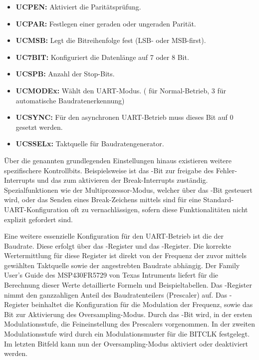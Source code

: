 \begin{itemize}
	\item \textbf{UCPEN:} Aktiviert die Parit\"atspr\"ufung.
	\item \textbf{UCPAR:} Festlegen einer geraden oder ungeraden Parit\"at.
	\item \textbf{UCMSB:} Legt die Bitreihenfolge fest (LSB- oder MSB-first).
	\item \textbf{UC7BIT:} Konfiguriert die Datenl\"ange auf 7 oder 8 Bit.
	\item \textbf{UCSPB:} Anzahl der Stop-Bits.
	\item \textbf{UCMODEx:} W\"ahlt den UART-Modus. ( f\"ur Normal-Betrieb, 3 f\"ur  automatische Baudratenerkennung)
	\item \textbf{UCSYNC:} F\"ur den asynchronen UART-Betrieb muss dieses Bit auf 0 gesetzt werden.
	\item \textbf{UCSSELx:} Taktquelle f\"ur Baudratengenerator.
\end{itemize}

\"Uber die genannten grundlegenden Einstellungen hinaus existieren weitere spezifischere Kontrollbits. Beispielsweise ist das -Bit zur freigabe des Fehler-Interrupts und das  zum aktivieren der Break-Interrupts zust\"andig. Spezialfunktionen wie der Multiprozessor-Modus, welcher \"uber das -Bit gesteuert wird, oder das Senden eines Break-Zeichens mittels  sind f\"ur eine Standard-UART-Konfiguration oft zu vernachl\"assigen, sofern diese Funktionalit\"aten nicht explizit gefordert sind.

Eine weitere essenzielle Konfiguration f\"ur den UART-Betrieb ist die der Baudrate. Diese erfolgt \"uber das -Register und das -Register. Die korrekte Wertermittlung f\"ur diese Register ist direkt von der Frequenz der zuvor mittels  gew\"ahlten Taktquelle sowie der angestrebten Baudrate abh\"angig. Der Family User's Guide des MSP430FR5729 von Texas Intruments liefert f\"ur die Berechnung dieser Werte detaillierte Formeln und Beispieltabellen. Das -Register nimmt den ganzzahligen Anteil des Baudratenteilers (Prescaler) auf. Das -Register beinhaltet die Konfiguration f\"ur die Modulation der Frequenz, sowie das Bit zur Aktivierung des Oversampling-Modus. Durch das -Bit wird, in der ersten Modulationsstufe, die Feineinstellung des Prescalers vorgenommen. In der zweiten Modulationsstufe wird durch  ein Modulationsmuster f\"ur die BITCLK festgelegt. Im letzten Bitfeld kann nun der Oversampling-Modus aktiviert oder deaktiviert werden.

